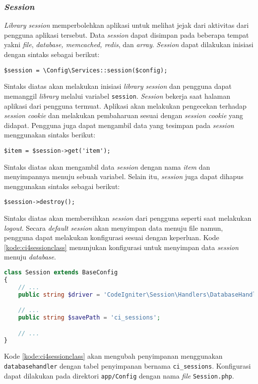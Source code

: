 \subsubsection{\textit{Session}}
\textit{Library session} memperbolehkan aplikasi untuk melihat jejak dari aktivitas dari pengguna aplikasi tersebut. Data \textit{session} dapat disimpan pada beberapa tempat yakni \textit{file}, \textit{database, memcached, redis}, dan \textit{array}. \textit{Session} dapat dilakukan inisiasi dengan sintaks sebagai berikut:
\begin{center}
	\verb|$session = \Config\Services::session($config);|
\end{center}
Sintaks diatas akan melakukan inisiasi \textit{library session} dan pengguna dapat memanggil \textit{library} melalui variabel \texttt{session}. \textit{Session} bekerja saat halaman aplikasi dari pengguna termuat. Aplikasi akan melakukan pengecekan terhadap \textit{session cookie} dan melakukan pembaharuan sesuai dengan \textit{session cookie} yang didapat. Pengguna juga dapat mengambil data yang tesimpan pada \textit{session} menggunakan sintaks berikut:
\begin{center}
	\verb|$item = $session->get('item');|
\end{center}
Sintaks diatas akan mengambil data \textit{session} dengan nama \textit{item} dan menyimpannya menuju sebuah variabel. Selain itu, \textit{session} juga dapat dihapus menggunakan sintaks sebagai berikut:
\begin{center}
	\verb|$session->destroy();|
\end{center}
Sintaks diatas akan membersihkan \textit{session} dari pengguna seperti saat melakukan \textit{logout}. Secara \textit{default session} akan menyimpan data menuju file namun, pengguna dapat melakukan konfigurasi sesuai dengan keperluan. Kode \ref{kode:ci4sessionclass} menunjukan konfigurasi untuk menyimpan data \textit{session} menuju \textit{database}.
\begin{lstlisting}[language=PHP, caption=Contoh kode untuk konfigurasi penyimpanan \textit{session}. ,label=kode:ci4sessionclass]
class Session extends BaseConfig
{
    // ...
    public string $driver = 'CodeIgniter\Session\Handlers\DatabaseHandler';

    // ...
    public string $savePath = 'ci_sessions';

    // ...
}
\end{lstlisting}
Kode \ref{kode:ci4sessionclass} akan mengubah penyimpanan menggunakan \texttt{databasehandler} dengan tabel penyimpanan bernama \texttt{ci\_sessions}. Konfigurasi dapat dilakukan pada direktori \texttt{app/Config} dengan nama \textit{file} \texttt{Session.php}.

